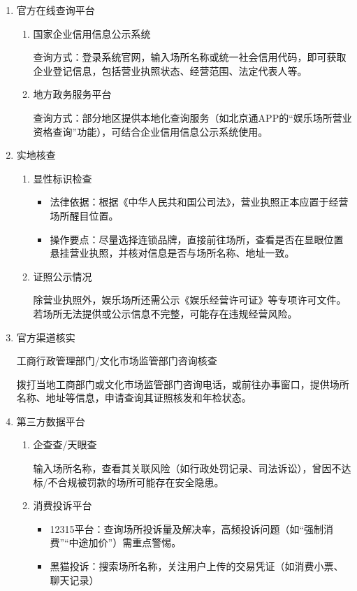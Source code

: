 \begin{enumerate}
  \item 官方在线查询平台
  \begin{enumerate}
    \item 国家企业信用信息公示系统

    查询方式：登录系统官网，输入场所名称或统一社会信用代码，即可获取企业登记信息，包括营业执照状态、经营范围、法定代表人等。

    \item 地方政务服务平台

    查询方式：部分地区提供本地化查询服务（如北京通APP的“娱乐场所营业资格查询”功能），可结合企业信用信息公示系统使用。
  \end{enumerate}
 \item 实地核查
 \begin{enumerate}
  \item 显性标识检查
  \begin{itemize}
    \item 法律依据：根据《中华人民共和国公司法》，营业执照正本应置于经营场所醒目位置。
    \item 操作要点：尽量选择连锁品牌，直接前往场所，查看是否在显眼位置悬挂营业执照，并核对信息是否与场所名称、地址一致。
  \end{itemize}
  \item 证照公示情况

  除营业执照外，娱乐场所还需公示《娱乐经营许可证》等专项许可文件。若场所无法提供或公示信息不完整，可能存在违规经营风险。
 \end{enumerate}
 \item 官方渠道核实

 工商行政管理部门/文化市场监管部门咨询核查

 拨打当地工商部门或文化市场监管部门咨询电话，或前往办事窗口，提供场所名称、地址等信息，申请查询其证照核发和年检状态。

 \item 第三方数据平台

 \begin{enumerate}
  \item 企查查/天眼查

  输入场所名称，查看其关联风险（如行政处罚记录、司法诉讼），曾因不达标/不合规被罚款的场所可能存在安全隐患。
  \item 消费投诉平台
         \begin{itemize}
          \item 12315平台：查询场所投诉量及解决率，高频投诉问题（如“强制消费”“中途加价”）需重点警惕。
          \item 黑猫投诉：搜索场所名称，关注用户上传的交易凭证（如消费小票、聊天记录）
         \end{itemize}
 \end{enumerate}
\end{enumerate}
